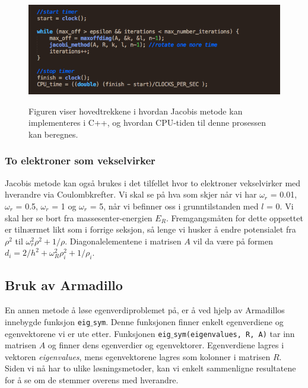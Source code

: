 \documentclass{article}
\begin{document}
\FloatBarrier
\begin{figure}[!ht]
  \begin{center}
  \includegraphics[width = 130mm]{jacobi_method.png}\\
  \caption{Figuren viser hovedtrekkene i hvordan Jacobis metode kan implementeres i C++, og hvordan CPU-tiden til denne prosessen kan beregnes.}\label{fig:jacobi}
  \end{center}
\end{figure}
\FloatBarrier

\subsubsection{To elektroner som vekselvirker}
Jacobis metode kan også brukes i det tilfellet hvor to elektroner vekselvirker med hverandre via Coulombkrefter. Vi skal se på hva som skjer når vi har $\omega_r$ = 0.01, $\omega_r$ = 0.5, $\omega_r$ = 1 og $\omega_r$ = 5, når vi befinner oss i grunntilstanden med $l$ = 0. Vi skal her se bort fra massesenter-energien $E_R$. Fremgangsmåten for dette oppsettet er tilnærmet likt som i forrige seksjon, så lenge vi husker å endre potensialet fra $\rho^2$ til $\omega_r^2\rho^2 + 1/\rho $. Diagonalelementene i matrisen $A$ vil da være på formen $d_i = 2/h^2 + \omega_R^2\rho_i^2 + 1/\rho_i$. 

\subsection{Bruk av Armadillo}
En annen metode å løse egenverdiproblemet på, er å ved hjelp av Armadillos innebygde funksjon \texttt{eig$\_$sym}. Denne funksjonen finner enkelt egenverdiene og egenvektorene vi er ute etter. Funksjonen \texttt{eig$\_$sym(eigenvalues, R, A)} tar inn matrisen $A$ og finner dens egenverdier og egenvektorer. Egenverdiene lagres i vektoren \textit{eigenvalues}, mens egenvektorene lagres som kolonner i matrisen $R$. Siden vi nå har to ulike løsningsmetoder, kan vi enkelt sammenligne resultatene for å se om de stemmer overens med hverandre.
\end{document}
